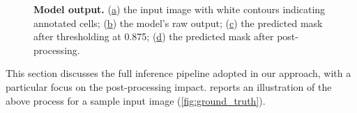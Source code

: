 \begin{figure}
    \caption{\textbf{Model output.} 
    (\hyperref[fig:ground_truth]{a}) the input image with white contours indicating annotated cells; (\hyperref[fig:heatmap]{b}) the model's raw output; 
    (\hyperref[fig:thresh]{c}) the predicted mask after thresholding at 0.875; (\hyperref[fig:post_proc]{d}) the predicted mask after post-processing.}
    \label{fig:model_output}
\end{figure}
This section discusses the full inference pipeline adopted in our approach, with a particular focus on the post-processing impact.
 reports an illustration of the above process for a sample input image (\cref{fig:ground_truth}).

